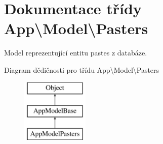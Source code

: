 \hypertarget{classApp_1_1Model_1_1Pasters}{\section{Dokumentace třídy App\textbackslash{}Model\textbackslash{}Pasters}
\label{classApp_1_1Model_1_1Pasters}
}


Model reprezentující entitu pastes z databáze.  


Diagram dědičnosti pro třídu App\textbackslash{}Model\textbackslash{}Pasters\begin{figure}[H]
\begin{center}
\leavevmode
\includegraphics[height=3.000000cm]{classApp_1_1Model_1_1Pasters}
\end{center}
\end{figure}
